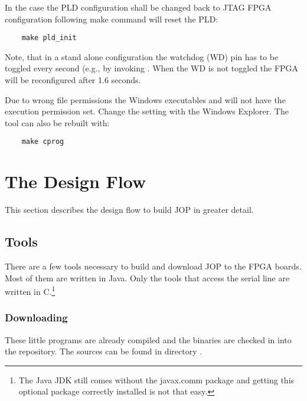 In the case the PLD configuration shall be changed back to JTAG FPGA
configuration following make command will reset the PLD:
\begin{lstlisting}
    make pld_init
\end{lstlisting}

Note, that in a stand alone configuration the watchdog (WD) pin has
to be toggled every second (e.g., by invoking .
When the WD is not toggled the FPGA will be reconfigured after 1.6
seconds.

Due to wrong file permissions the Windows executables 
and  will not have the execution permission set.
Change the setting with the Windows Explorer. The tool 
can also be rebuilt with:
\begin{lstlisting}
    make cprog
\end{lstlisting}


\section{The Design Flow}

This section describes the design flow to build JOP in greater
detail.

\subsection{Tools}

There are a few tools necessary to build and download JOP to the FPGA
boards. Most of them are written in Java. Only the tools that access
the serial line are written in C.\footnote{The Java JDK still comes
without the javax.comm package and getting this optional package
correctly installed is not that easy.}

\subsubsection{Downloading}

These little programs are already compiled and the binaries are
checked in into the repository. The sources can be found in directory
.

